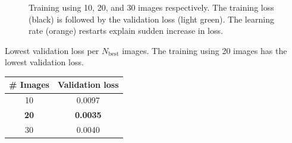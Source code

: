 \begin{figure}
    \caption[Training with 10 images]{
        Training using 10, 20, and 30 images respectively.
        The training loss (black) is followed by the validation loss (light green).
        The learning rate (orange) restarts explain sudden increase in loss.
    }
    \label{fig:skinstression-training}
\end{figure}

\begin{margintable}
    \centering
    \caption[Lowest validation loss per $N_\mathrm{best}$ images]{
        Lowest validation loss per $N_\mathrm{best}$ images.
        The training using 20 images has the lowest validation loss.
    }
    \label{tab:skin_train_102030}
    \begin{tabular}{c c}
        \toprule
        \# Images   & Validation loss \\
        \midrule
        10          & 0.0097          \\
        \textbf{20} & \textbf{0.0035} \\
        30          & 0.0040          \\
        \bottomrule
    \end{tabular}
\end{margintable}

